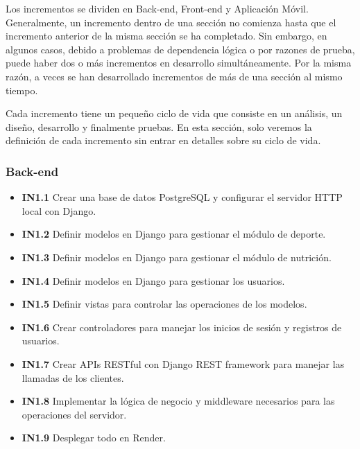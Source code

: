 Los incrementos se dividen en Back-end, Front-end y Aplicación Móvil. Generalmente, un incremento dentro de una sección no comienza hasta que el incremento anterior de la misma sección se ha completado. Sin embargo, en algunos casos, debido a problemas de dependencia lógica o por razones de prueba, puede haber dos o más incrementos en desarrollo simultáneamente. Por la misma razón, a veces se han desarrollado incrementos de más de una sección al mismo tiempo.

Cada incremento tiene un pequeño ciclo de vida que consiste en un análisis, un diseño, desarrollo y finalmente pruebas. En esta sección, solo veremos la definición de cada incremento sin entrar en detalles sobre su ciclo de vida.

\subsubsection{Back-end}
\begin{itemize}
    \item \textbf{IN1.1} Crear una base de datos PostgreSQL y configurar el servidor HTTP local con Django.
    \item \textbf{IN1.2} Definir modelos en Django para gestionar el módulo de deporte.
    \item \textbf{IN1.3} Definir modelos en Django para gestionar el módulo de nutrición.
    \item \textbf{IN1.4} Definir modelos en Django para gestionar los usuarios.
    \item \textbf{IN1.5} Definir vistas para controlar las operaciones de los modelos.
    \item \textbf{IN1.6} Crear controladores para manejar los inicios de sesión y registros de usuarios.
    \item \textbf{IN1.7} Crear APIs RESTful con Django REST framework para manejar las llamadas de los clientes.
    \item \textbf{IN1.8} Implementar la lógica de negocio y middleware necesarios para las operaciones del servidor.
    \item \textbf{IN1.9} Desplegar todo en Render.
\end{itemize}

